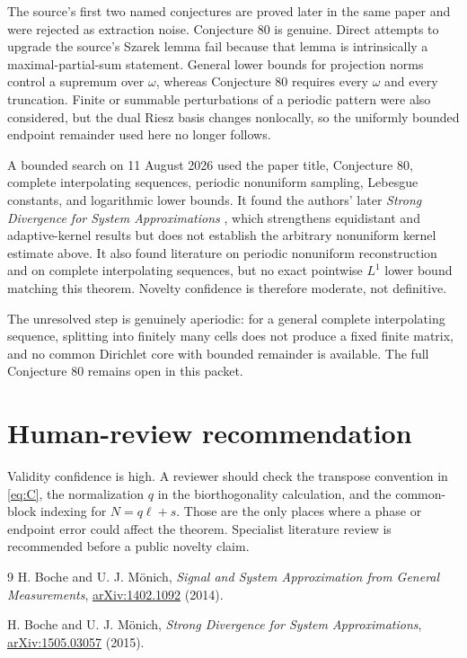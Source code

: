 \documentclass[11pt]{article}
\begin{document}
The source's first two named conjectures are proved later in the same paper
and were rejected as extraction noise.  Conjecture 80 is genuine.  Direct
attempts to upgrade the source's Szarek lemma fail because that lemma is
intrinsically a maximal-partial-sum statement.  General lower bounds for
projection norms control a supremum over \(\omega\), whereas Conjecture 80
requires every \(\omega\) and every truncation.  Finite or summable
perturbations of a periodic pattern were also considered, but the dual
Riesz basis changes nonlocally, so the uniformly bounded endpoint remainder
used here no longer follows.

A bounded search on 11 August 2026 used the paper title, Conjecture 80,
complete interpolating sequences, periodic nonuniform sampling, Lebesgue
constants, and logarithmic lower bounds.  It found the authors' later
\emph{Strong Divergence for System Approximations} \cite{strong}, which
strengthens equidistant and adaptive-kernel results but does not establish
the arbitrary nonuniform kernel estimate above.  It also found literature
on periodic nonuniform reconstruction and on complete interpolating
sequences, but no exact pointwise \(L^1\) lower bound matching this theorem.
Novelty confidence is therefore moderate, not definitive.

The unresolved step is genuinely aperiodic: for a general complete
interpolating sequence, splitting into finitely many cells does not produce
a fixed finite matrix, and no common Dirichlet core with bounded remainder
is available.  The full Conjecture 80 remains open in this packet.

\section*{Human-review recommendation}

Validity confidence is high.  A reviewer should check the transpose
convention in \eqref{eq:C}, the normalization \(q\) in the biorthogonality
calculation, and the common-block indexing for \(N=q\ell+s\).  Those are the
only places where a phase or endpoint error could affect the theorem.
Specialist literature review is recommended before a public novelty claim.

\begin{thebibliography}{9}
H. Boche and U. J. M\"onich,
\emph{Signal and System Approximation from General Measurements},
\href{https://arxiv.org/abs/1402.1092}{arXiv:1402.1092} (2014).

H. Boche and U. J. M\"onich,
\emph{Strong Divergence for System Approximations},
\href{https://arxiv.org/abs/1505.03057}{arXiv:1505.03057} (2015).
\end{thebibliography}
\end{document}
